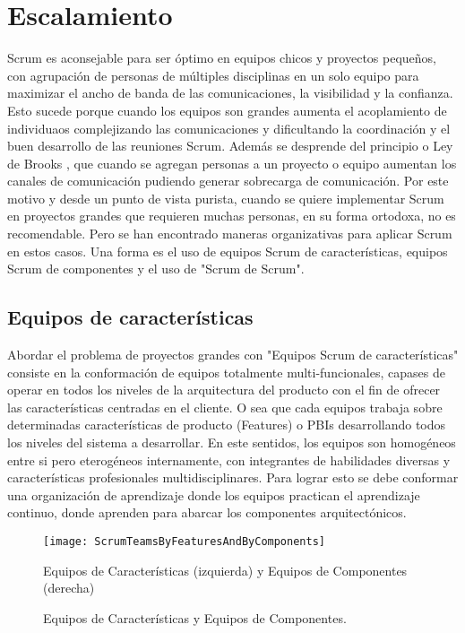 \chapter{Escalamiento}

Scrum es aconsejable para ser óptimo en equipos chicos y proyectos pequeños, con agrupación de personas de múltiples disciplinas en un solo equipo para maximizar el ancho de banda de las comunicaciones, la visibilidad y la confianza. Esto sucede porque cuando los equipos son grandes aumenta el acoplamiento de individuaos complejizando las comunicaciones y dificultando la coordinación y el buen desarrollo de las reuniones Scrum. Además se desprende del principio o Ley de Brooks , que cuando se agregan personas a un proyecto o equipo aumentan los canales de comunicación pudiendo generar sobrecarga de comunicación. Por este motivo y desde un punto de vista purista, cuando se quiere implementar Scrum en proyectos grandes que requieren muchas personas, en su forma ortodoxa, no es recomendable. Pero se han encontrado maneras organizativas para aplicar Scrum en estos casos. Una forma es el uso de equipos Scrum de características, equipos Scrum de componentes y el uso de "Scrum de Scrum".

\section{Equipos de características}

Abordar el problema de proyectos grandes con "Equipos Scrum de características" consiste en la conformación de equipos totalmente multi-funcionales, capases de operar en todos los niveles de la arquitectura del producto con el fin de ofrecer las características centradas en el cliente. O sea que cada equipos trabaja sobre determinadas características de producto (Features) o PBIs desarrollando todos los niveles del sistema a desarrollar. En este sentidos, los equipos son homogéneos entre si pero eterogéneos internamente, con integrantes de habilidades diversas y características profesionales multidisciplinares. Para lograr esto se debe conformar una organización de aprendizaje donde los equipos practican el aprendizaje continuo, donde aprenden para abarcar los componentes arquitectónicos. 

\begin{figure}[h]
  \centering
  \texttt{[image: ScrumTeamsByFeaturesAndByComponents]}
  \caption{Equipos de Características y Equipos de Componentes.}
  Equipos de Características (izquierda) y Equipos de Componentes (derecha)
  \centering
  \label{fig:ScrumTeamsByFeaturesAndByComponents} %
\end{figure}


